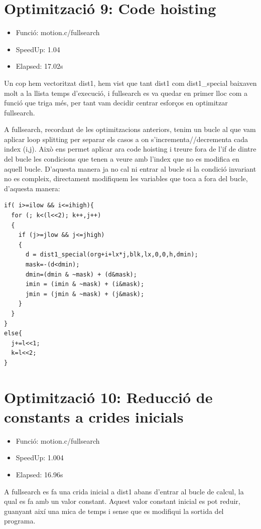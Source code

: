 \section{Optimitzaci\'o 9: Code hoisting}
\begin{itemize}
\item{Funció: motion.c/fullsearch}
\item{SpeedUp: 1.04}
\item{Elapsed: 17.02s}
\end{itemize}

Un cop hem vectoritzat dist1, hem vist que tant dist1 com dist1\_special baixaven molt a la llista temps d'execució, i fullsearch es va quedar en primer lloc com a funció que triga més, per tant vam decidir centrar esforços en optimitzar fullsearch.

A fullsearch, recordant de les optimitzacions anteriors, tenim un bucle al que vam aplicar loop splitting per separar els casos a on s'incrementa//decrementa cada index (i,j). Això ens permet aplicar ara code hoisting i treure fora de l'if de dintre del bucle les condicions que tenen a veure amb l'index que no es modifica en aquell bucle. D'aquesta manera ja no cal ni entrar al bucle si la condició invariant no es compleix, directament modifiquem les variables que toca a fora del bucle, d'aquesta manera:

\begin{lstlisting}
if( i>=ilow && i<=ihigh){
  for (; k<(l<<2); k++,j++)
  {
    if (j>=jlow && j<=jhigh)
    {
      d = dist1_special(org+i+lx*j,blk,lx,0,0,h,dmin);
      mask=-(d<dmin);
      dmin=(dmin & ~mask) + (d&mask);
      imin = (imin & ~mask) + (i&mask);
      jmin = (jmin & ~mask) + (j&mask);
    }
  } 
}
else{
  j+=l<<1;
  k=l<<2;	
}	 	
\end{lstlisting}

\section{Optimitzaci\'o 10: Reducci\'o de constants a crides inicials}
\begin{itemize}
\item{Funció: motion.c/fullsearch}
\item{SpeedUp: 1.004 }
\item{Elapsed: 16.96s}
\end{itemize}

A fullsearch es fa una crida inicial a dist1 abans d'entrar al bucle de calcul, la qual es fa amb un valor constant. Aquest valor constant inicial es pot reduir, guanyant així una mica de temps i sense que es modifiqui la sortida del programa.

